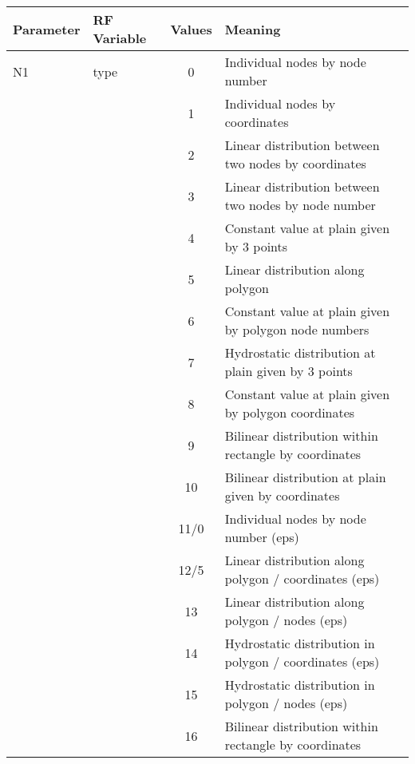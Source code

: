 \begin{tabular}{|l|p{2.75cm}|c|p{8.5cm}|}
  \hline
  Parameter &    RF Variable \quad      &  Values  & Meaning           \\
  \hline
%
  \hline
%
  N1        & {\footnotesize type} &    0     & Individual nodes by node number  \\
            &                      &    1     & Individual nodes by coordinates   \\
            &                      &    2     & Linear distribution between two nodes by coordinates   \\
            &                      &    3     & Linear distribution between two nodes by node number   \\
            &                      &    4     & Constant value at plain given by 3 points   \\
            &                      &    5     & Linear distribution along polygon   \\
            &                      &    6     & Constant value at plain given by polygon node numbers   \\
            &                      &    7     & Hydrostatic distribution at plain given by 3 points   \\
            &                      &    8     & Constant value at plain given by polygon coordinates   \\
            &                      &    9     & Bilinear distribution within rectangle by coordinates   \\
            &                      &    10    & Bilinear distribution at plain given by coordinates   \\
            &                      &    11/0  & Individual nodes by node number (eps)   \\
            &                      &    12/5  & Linear distribution along polygon / coordinates (eps)   \\
            &                      &    13    & Linear distribution along polygon / nodes (eps)   \\
            &                      &    14    & Hydrostatic distribution in polygon / coordinates (eps)   \\
            &                      &    15    & Hydrostatic distribution in polygon / nodes (eps)   \\
            &                      &    16    & Bilinear distribution within rectangle by coordinates   \\

\end{tabular}
